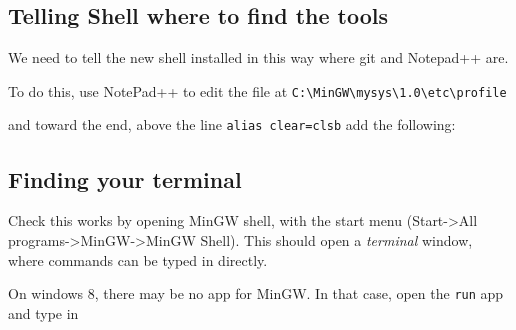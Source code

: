 \subsection{Telling Shell where to find the
tools}\label{telling-shell-where-to-find-the-tools}

We need to tell the new shell installed in this way where git and
Notepad++ are.

To do this, use NotePad++ to edit the file at
\texttt{C:\textbackslash{}MinGW\textbackslash{}mysys\textbackslash{}1.0\textbackslash{}etc\textbackslash{}profile}

and toward the end, above the line \texttt{alias clear=clsb} add the
following:

\begin{Shaded}
\begin{Highlighting}[]
 \DataTypeTok{\textbackslash{} }\DataTypeTok{\textbackslash{} \textbackslash{}(}\DataTypeTok{\textbackslash{})}
 \DataTypeTok{\textbackslash{} }\DataTypeTok{\textbackslash{} \textbackslash{}(}\DataTypeTok{\textbackslash{})}
\end{Highlighting}
\end{Shaded}

\subsection{Finding your terminal}\label{finding-your-terminal}

Check this works by opening MinGW shell, with the start menu
(Start-\textgreater{}All
programs-\textgreater{}MinGW-\textgreater{}MinGW Shell). This should
open a \emph{terminal} window, where commands can be typed in directly.

On windows 8, there may be no app for MinGW. In that case, open the
\texttt{run} app and type in

\begin{Shaded}
\begin{Highlighting}[]
\end{Highlighting}
\end{Shaded}

